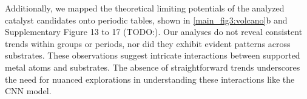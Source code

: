 Additionally, we mapped the theoretical limiting potentials of the analyzed catalyst candidates onto periodic tables, shown in \cref{main_fig3:volcano}b and Supplementary Figure 13 to 17 (TODO:).
Our analyses do not reveal consistent trends within groups or periods, nor did they exhibit evident patterns across substrates.
These observations suggest intricate interactions between supported metal atoms and substrates.
The absence of straightforward trends underscores the need for nuanced explorations in understanding these interactions like the CNN model.
